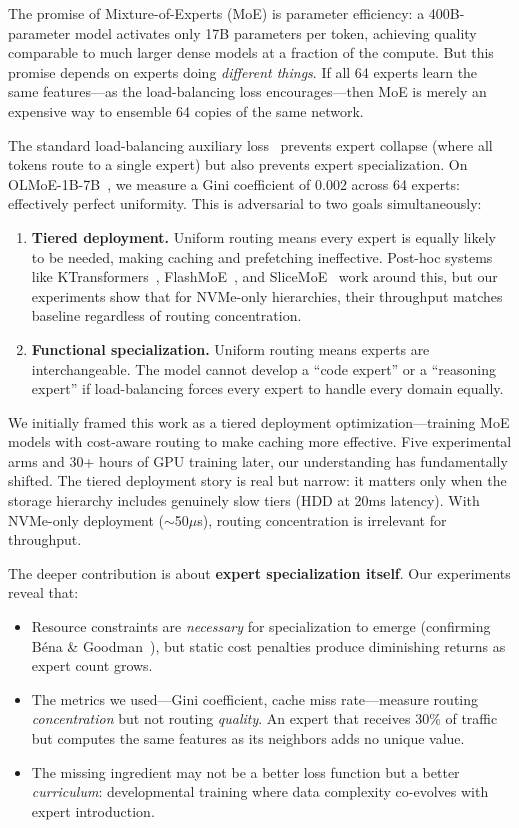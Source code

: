 \documentclass{article}
\begin{document}
The promise of Mixture-of-Experts (MoE) is parameter efficiency: a 400B-parameter model activates only 17B parameters per token, achieving quality comparable to much larger dense models at a fraction of the compute. But this promise depends on experts doing \emph{different things}. If all 64 experts learn the same features---as the load-balancing loss encourages---then MoE is merely an expensive way to ensemble 64 copies of the same network.

The standard load-balancing auxiliary loss~\cite{fedus2022switch} prevents expert collapse (where all tokens route to a single expert) but also prevents expert specialization. On OLMoE-1B-7B~\cite{muennighoff2024olmoe}, we measure a Gini coefficient of 0.002 across 64 experts: effectively perfect uniformity. This is adversarial to two goals simultaneously:

\begin{enumerate}
    \item \textbf{Tiered deployment.} Uniform routing means every expert is equally likely to be needed, making caching and prefetching ineffective. Post-hoc systems like KTransformers~\cite{ktransformers2025}, FlashMoE~\cite{flashmoe2026}, and SliceMoE~\cite{slicemoe2026} work around this, but our experiments show that for NVMe-only hierarchies, their throughput matches baseline regardless of routing concentration.
    \item \textbf{Functional specialization.} Uniform routing means experts are interchangeable. The model cannot develop a ``code expert'' or a ``reasoning expert'' if load-balancing forces every expert to handle every domain equally.
\end{enumerate}

We initially framed this work as a tiered deployment optimization---training MoE models with cost-aware routing to make caching more effective. Five experimental arms and 30+ hours of GPU training later, our understanding has fundamentally shifted. The tiered deployment story is real but narrow: it matters only when the storage hierarchy includes genuinely slow tiers (HDD at 20ms latency). With NVMe-only deployment ($\sim$50$\mu$s), routing concentration is irrelevant for throughput.

The deeper contribution is about \textbf{expert specialization itself}. Our experiments reveal that:

\begin{itemize}
    \item Resource constraints are \emph{necessary} for specialization to emerge (confirming Béna \& Goodman~\cite{bena2025modularity}), but static cost penalties produce diminishing returns as expert count grows.
    \item The metrics we used---Gini coefficient, cache miss rate---measure routing \emph{concentration} but not routing \emph{quality}. An expert that receives 30\% of traffic but computes the same features as its neighbors adds no unique value.
    \item The missing ingredient may not be a better loss function but a better \emph{curriculum}: developmental training where data complexity co-evolves with expert introduction.
\end{itemize}
\end{document}
